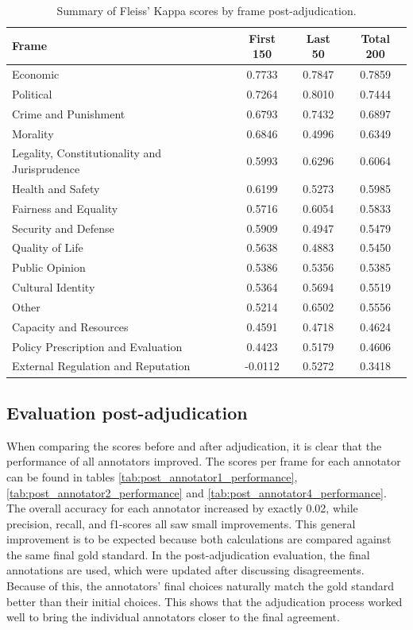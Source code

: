 \documentclass[
10pt, %
a4paper, %
oneside, %
headinclude,footinclude, %
] {book}%
\begin{document}
\begin{table}[htbp]
\small
\centering
\begin{tabular}{|l|c|c|c|}
\hline
\textbf{Frame} & \textbf{First 150} & \textbf{Last 50} & \textbf{Total 200} \\
\hline
Economic & 0.7733 & 0.7847 & 0.7859 \\ \hline
Political & 0.7264 & 0.8010 & 0.7444 \\ \hline
Crime and Punishment & 0.6793 & 0.7432 & 0.6897 \\ \hline
Morality & 0.6846 & 0.4996 & 0.6349 \\ \hline
Legality, Constitutionality and Jurisprudence & 0.5993 & 0.6296 & 0.6064 \\ \hline
Health and Safety & 0.6199 & 0.5273 & 0.5985 \\ \hline
Fairness and Equality & 0.5716 & 0.6054 & 0.5833 \\ \hline
Security and Defense & 0.5909 & 0.4947 & 0.5479 \\ \hline
Quality of Life & 0.5638 & 0.4883 & 0.5450 \\ \hline
Public Opinion & 0.5386 & 0.5356 & 0.5385 \\ \hline
Cultural Identity & 0.5364 & 0.5694 & 0.5519 \\ \hline
Other & 0.5214 & 0.6502 & 0.5556 \\ \hline
Capacity and Resources & 0.4591 & 0.4718 & 0.4624 \\ \hline
Policy Prescription and Evaluation & 0.4423 & 0.5179 & 0.4606 \\ \hline
External Regulation and Reputation & -0.0112 & 0.5272 & 0.3418 \\ \hline
\end{tabular}
\caption{Summary of Fleiss' Kappa scores by frame post-adjudication.}
\label{tab:fleiss_kappa_post_summary}
\end{table}



\subsection{Evaluation post-adjudication}
When comparing the scores before and after adjudication, it is clear that the performance of all annotators improved. The scores per frame for each annotator can be found in tables \ref{tab:post_annotator1_performance}, \ref{tab:post_annotator2_performance} and \ref{tab:post_annotator4_performance}. The overall accuracy for each annotator increased by exactly 0.02, while precision, recall, and f1-scores all saw small improvements. This general improvement is to be expected because both calculations are compared against the same final gold standard. In the post-adjudication evaluation, the final annotations are used, which were updated after discussing disagreements. Because of this, the annotators' final choices naturally match the gold standard better than their initial choices. This shows that the adjudication process worked well to bring the individual annotators closer to the final agreement.
\end{document}
